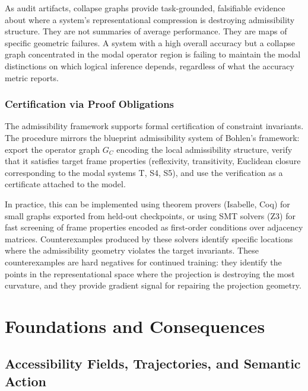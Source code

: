 \documentclass[12pt, oneside]{book}
\theoremstyle{plain-flyxion}
\theoremstyle{definition-flyxion}
\begin{document}
As audit artifacts, collapse graphs provide task-grounded, falsifiable evidence about
where a system's representational compression is destroying admissibility structure. They
are not summaries of average performance. They are maps of specific geometric failures.
A system with a high overall accuracy but a collapse graph concentrated in the modal
operator region is failing to maintain the modal distinctions on which logical inference
depends, regardless of what the accuracy metric reports.

\section{Certification via Proof Obligations}

The admissibility framework supports formal certification of constraint invariants. The
procedure mirrors the blueprint admissibility system of Bohlen's framework: export the
operator graph $G_C$ encoding the local admissibility structure, verify that it satisfies
target frame properties (reflexivity, transitivity, Euclidean closure corresponding to
the modal systems T, S4, S5), and use the verification as a certificate attached to the
model.

In practice, this can be implemented using theorem provers (Isabelle, Coq) for small
graphs exported from held-out checkpoints, or using SMT solvers (Z3) for fast screening
of frame properties encoded as first-order conditions over adjacency matrices. Counterexamples
produced by these solvers identify specific locations where the admissibility geometry
violates the target invariants. These counterexamples are hard negatives for continued
training: they identify the points in the representational space where the projection is
destroying the most curvature, and they provide gradient signal for repairing the
projection geometry.

\part{Foundations and Consequences}

\chapter{Accessibility Fields, Trajectories, and Semantic Action}
\end{document}
